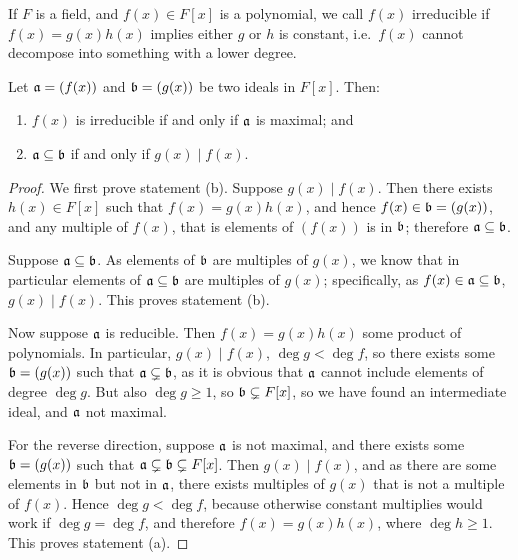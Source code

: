\begin{definition}
    If \(F\) is a field, and \(f(x) \in F[x]\) is a polynomial,
    we call \(f(x)\) irreducible
    if \(f(x) = g(x)h(x)\) implies either \(g\) or \(h\) is constant,
    i.e.\ \(f(x)\) cannot decompose into something with a lower degree.
\end{definition}
\begin{theorem}\label{thm:ideal-divisibility}
    Let \(\mathfrak{a} = (f(x))\) and \(\mathfrak{b} = (g(x))\) be two ideals in \(F[x]\).
    Then:
    \begin{enumerate}[label={(\alph*)}, itemsep=0mm]
        \item \(f(x)\) is irreducible if and only if \(\mathfrak{a}\) is maximal; and
        \item \(\mathfrak{a} \subseteq \mathfrak{b}\) if and only if \(g(x) \mid f(x)\).
    \end{enumerate}
\end{theorem}
\begin{proof}
    We first prove statement (b).
    Suppose \(g(x) \mid f(x)\).
    Then there exists \(h(x) \in F[x]\) such that \(f(x) = g(x)h(x)\),
    and hence \(f(x) \in \mathfrak{b} = (g(x))\),
    and any multiple of \(f(x)\), that is elements of \((f(x))\) is in \(\mathfrak{b}\);
    therefore \(\mathfrak{a} \subseteq \mathfrak{b}\).

    Suppose \(\mathfrak{a} \subseteq \mathfrak{b}\).
    As elements of \(\mathfrak{b}\) are multiples of \(g(x)\),
    we know that in particular elements of \(\mathfrak{a} \subseteq \mathfrak{b}\)
    are multiples of \(g(x)\);
    specifically, as \(f(x) \in \mathfrak{a} \subseteq \mathfrak{b}\),
    \(g(x) \mid f(x)\).
    This proves statement (b).

    \medskip

    Now suppose \(\mathfrak{a}\) is reducible.
    Then \(f(x) = g(x)h(x)\) some product of polynomials.
    In particular, \(g(x) \mid f(x)\), \(\deg g < \deg f\),
    so there exists some \(\mathfrak{b} = (g(x))\) such that \(\mathfrak{a} \subsetneq \mathfrak{b}\),
    as it is obvious that \(\mathfrak{a}\) cannot include elements of degree \(\deg g\).
    But also \(\deg g \geq 1\), so \(\mathfrak{b} \subsetneq F[x]\),
    so we have found an intermediate ideal,
    and \(\mathfrak{a}\) not maximal.

    For the reverse direction,
    suppose \(\mathfrak{a}\) is not maximal,
    and there exists some \(\mathfrak{b} = (g(x))\)
    such that \(\mathfrak{a} \subsetneq \mathfrak{b} \subsetneq F[x]\).
    Then \(g(x) \mid f(x)\),
    and as there are some elements in \(\mathfrak{b}\) but not in \(\mathfrak{a}\),
    there exists multiples of \(g(x)\) that is not a multiple of \(f(x)\).
    Hence \(\deg g < \deg f\),
    because otherwise constant multiplies would work if \(\deg g = \deg f\),
    and therefore \(f(x) = g(x)h(x)\),
    where \(\deg h \geq 1\).
    This proves statement (a).
\end{proof}

